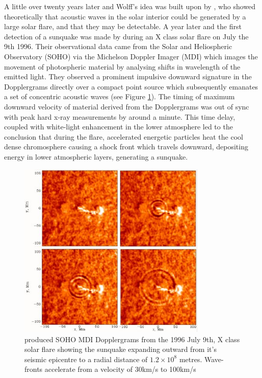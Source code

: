 A little over twenty years later and Wolff's idea was built upon by \cite{1995ESASP.376b.341K}, who showed theoretically that acoustic waves in the solar interior could be generated by a large solar flare, and that they may be detectable. A year later and the first detection of a sunquake was made by \cite{1998Natur.393..317K} during an X class solar flare on July the 9th 1996. Their observational data came from the Solar and Heliospheric Observatory (SOHO) via the Michelson Doppler Imager (MDI) which images the movement of photospheric material by analysing shifts in wavelength of the emitted light. They observed a prominent impulsive downward signature in the Dopplergrams directly over a compact point source which subsequently emanates a set of concentric acoustic waves (see Figure \ref{mdiquake96}). The timing of maximum downward velocity of material derived from the Dopplergrams was out of sync with peak hard x-ray measurements by around a minute. This time delay, coupled with white-light enhancement in the lower atmosphere led to the conclusion that during the flare, accelerated energetic particles heat the cool dense chromosphere causing a shock front which travels downward, depositing energy in lower atmospheric layers, generating a sunquake. 
 
\begin{figure}[hb]
  \begin{center}
  \includegraphics[width=0.80\textwidth]{soho-mdi-quake-96}  
\caption{\cite{1998Natur.393..317K} produced SOHO MDI Dopplergrams from the 1996 July 9th, X class solar flare showing the sunquake expanding outward from it's seismic epicentre to a radial distance of $1.2\times10^{8}$ metres. Wave-fronts accelerate from a velocity of 30km/s to 100km/s}\label{mdiquake96}
\end{center}
\end{figure}


